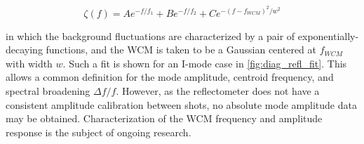 \begin{equation}\label{eq:wcm}
 \zeta(f) = A e^{-f/f_1} + B e^{-f/f_2} + C e^{-(f-f_{WCM})^2/w^2}
\end{equation}

\noindent in which the background fluctuations are characterized by a pair of exponentially-decaying functions, and the WCM is taken to be a Gaussian centered at $f_{WCM}$ with width $w$.  Such a fit is shown for an I-mode case in \cref{fig:diag_refl_fit}.  This allows a common definition for the mode amplitude, centroid frequency, and spectral broadening $\Delta f/f$.  However, as the reflectometer does not have a consistent amplitude calibration between shots, no absolute mode amplitude data may be obtained.  Characterization of the WCM frequency and amplitude response is the subject of ongoing research.\nicechapterending

\begin{figure}[t]
 \pushtooutside
\end{figure}


